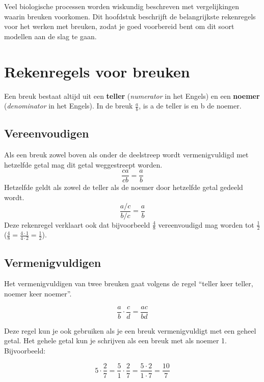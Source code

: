 \documentclass[
  a4paper,
]{scrbook}
\theoremstyle{definition}
\theoremstyle{remark}
\begin{document}
Veel biologische processen worden wiskundig beschreven met
vergelijkingen waarin breuken voorkomen. Dit hoofdstuk beschrijft de
belangrijkste rekenregels voor het werken met breuken, zodat je goed
voorbereid bent om dit soort modellen aan de slag te gaan.

\section{Rekenregels voor breuken}\label{rekenregels-voor-breuken}

Een breuk bestaat altijd uit een \textbf{teller} (\emph{numerator} in
het Engels) en een \textbf{noemer} (\emph{denominator} in het Engels).
In de breuk \(\frac{a}{b}\), is a de teller is en b de noemer.

\subsection*{Vereenvoudigen}\label{vereenvoudigen}

Als een breuk zowel boven als onder de deelstreep wordt vermenigvuldigd
met hetzelfde getal mag dit getal weggestreept worden. \[
\frac{ca}{cb} = \frac{a}{b}
\] Hetzelfde geldt als zowel de teller als de noemer door hetzelfde
getal gedeeld wordt. \[
\frac{a/c}{b/c} = \frac{a}{b}
\] Deze rekenregel verklaart ook dat bijvoorbeeld \(\frac{4}{8}\)
vereenvoudigd mag worden tot \(\frac{1}{2}\)
(\(\frac{4}{8} = \frac{4\cdot1}{4\cdot2} = \frac{1}{2}\)).

\subsection*{Vermenigvuldigen}\label{vermenigvuldigen}

Het vermenigvuldigen van twee breuken gaat volgens de regel ``teller
keer teller, noemer keer noemer''.

\[
\frac{a}{b}\cdot\frac{c}{d}=\frac{ac}{bd}
\]

\begin{tcolorbox}[enhanced jigsaw, rightrule=.15mm, opacityback=0, leftrule=.75mm, title=\textcolor{quarto-callout-tip-color}{\faLightbulb}\hspace{0.5em}{Tip}, toptitle=1mm, titlerule=0mm, opacitybacktitle=0.6, colframe=quarto-callout-tip-color-frame, breakable, colbacktitle=quarto-callout-tip-color!10!white, coltitle=black, toprule=.15mm, bottomrule=.15mm, left=2mm, bottomtitle=1mm, arc=.35mm, colback=white]

Deze regel kun je ook gebruiken als je een breuk vermenigvuldigt met een
geheel getal. Het gehele getal kun je schrijven als een breuk met als
noemer 1. Bijvoorbeeld:

\[
5\cdot\frac{2}{7} = \frac{5}{1}\cdot\frac{2}{7} = \frac{5\cdot2}{1\cdot7} = \frac{10}{7}
\]

\end{tcolorbox}
\end{document}
